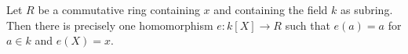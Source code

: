 Let $R$ be a commutative ring containing $x$ and containing the field $k$ as subring. Then there is precisely one homomorphism $e: k[X] \to R$ such that $e(a) = a$ for $a \in k$ and $e(X) = x$.

